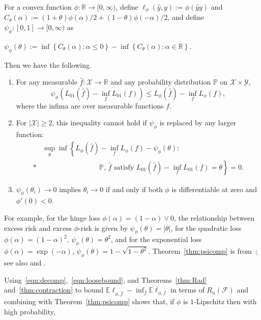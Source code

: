 \begin{theorem}\label{thm:psicomp}
For a convex function $\phi:{\mathbb R}\to[0,\infty)$, define $\ell_\phi(\widehat
y,y) := \phi(\widehat y y)$ and
$C_\theta(\alpha):=(1+\theta)\phi(\alpha)/2+(1-\theta)\phi(-\alpha)/2$,
and define $\psi_\phi:[0,1]\to[0,\infty)$ as

  $  \psi_\phi(\theta)

  :=
      \inf\left\{ C_\theta(\alpha)

        : \alpha\le 0\right\}

      -\inf\left\{ C_\theta(\alpha)

        : \alpha\in{\mathbb R}\right\}$.

Then we have the following.
\begin{enumerate}
\item For any measurable $\widehat f:{\mathcal X}\to{\mathbb R}$ and any probability distribution $\mathbb{P}$ on ${\mathcal X}\times{\mathcal Y}$,
  \[
    \psi_\phi\left(L_{01}(\widehat f) - \inf_f L_{01}(f)\right) \le
    L_{\phi}(\widehat f) - \inf_f L_{\phi}(f),
  \]
where the infima are over measurable functions $f$.
\item For $|{\mathcal X}|\ge 2$, this inequality cannot hold if
$\psi_\phi$ is replaced by any larger function:
  \begin{align*}
    &\sup_\theta \inf\left\{
    L_{\phi}(\widehat f) - \inf_f L_{\phi}(f) - \psi_\phi(\theta):
    \right.  \\*
    &\qquad\qquad\qquad\qquad\left.
    \text{$\mathbb{P}$, $\widehat f$ satisfy }
    L_{01}(\widehat f) - \inf_f L_{01}(f) = \theta\right\} = 0.
  \end{align*}
\item $\psi_\phi(\theta_i)\to 0$ implies
$\theta_i\to 0$ if and only if both $\phi$ is differentiable at zero and
$\phi'(0)<0$.
\end{enumerate}
\end{theorem}

For example, for the hinge loss $\phi(\alpha)= (1-\alpha)\vee 0$, the relationship between excess risk and excess $\phi$-risk is given by $\psi_\phi(\theta)=|\theta|$, for the quadratic loss
$\phi(\alpha)=(1-\alpha)^2$, $\psi_\phi(\theta)=\theta^2$,
and for the exponential loss $\phi(\alpha) =
\exp(-\alpha)$, $\psi_\phi(\theta)=1-\sqrt{1-\theta^2}$.
Theorem~\ref{thm:psicomp} is from~\cite{bjm-ccrb-05}; see also \cite{l-nmblfc-04,lv-brcrbm-04} and \cite{z-sbccbcrm-04}.

Using~\eqref{eqn:decomp},~\eqref{eqn:loosebound},
and Theorems~\ref{thm:Rad} and~\ref{thm:contraction} to bound
${\mathbb E}\ell_{\phi,\widehat f}-\inf_f{\mathbb E}\ell_{\phi,f}$ in terms of
$R_n({\mathcal F})$ and combining with Theorem~\ref{thm:psicomp} shows that, if
$\phi$ is $1$-Lipschitz then with high probability,

